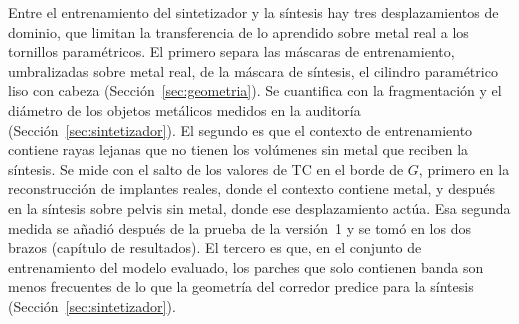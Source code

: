 Entre el entrenamiento del sintetizador y la síntesis hay tres desplazamientos de dominio, que limitan la transferencia de lo aprendido sobre metal real a los tornillos paramétricos. El primero separa las máscaras de entrenamiento, umbralizadas sobre metal real, de la máscara de síntesis, el cilindro paramétrico liso con cabeza (Sección~\ref{sec:geometria}). Se cuantifica con la fragmentación y el diámetro de los objetos metálicos medidos en la auditoría (Sección~\ref{sec:sintetizador}). El segundo es que el contexto de entrenamiento contiene rayas lejanas que no tienen los volúmenes sin metal que reciben la síntesis. Se mide con el salto de los valores de TC en el borde de $G$, primero en la reconstrucción de implantes reales, donde el contexto contiene metal, y después en la síntesis sobre pelvis sin metal, donde ese desplazamiento actúa. Esa segunda medida se añadió después de la prueba de la versión~1 y se tomó en los dos brazos (capítulo de resultados). El tercero es que, en el conjunto de entrenamiento del modelo evaluado, los parches que solo contienen banda son menos frecuentes de lo que la geometría del corredor predice para la síntesis (Sección~\ref{sec:sintetizador}).
